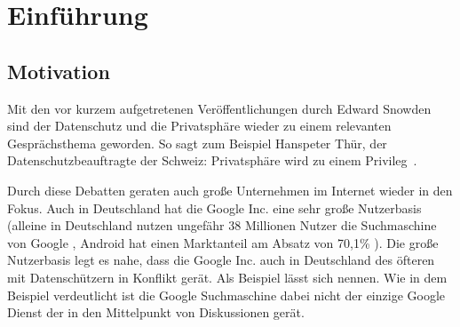 %
% 

\chapter{Einführung}


\section{Motivation}
Mit den vor kurzem aufgetretenen Veröffentlichungen durch Edward Snowden sind der Datenschutz und die Privatsphäre wieder zu einem relevanten Gesprächsthema geworden. So sagt zum Beispiel Hanspeter Thür, der Datenschutzbeauftragte der Schweiz: \glqq Privatsphäre wird zu einem Privileg\grqq\ \cite{nzzdatenschutzprivileg}.

Durch diese Debatten geraten auch große Unternehmen im Internet wieder in den Fokus. Auch in Deutschland hat die Google Inc. eine sehr große Nutzerbasis (alleine in Deutschland nutzen ungefähr 38 Millionen Nutzer die Suchmaschine von Google \cite{statistagoogle}, Android hat einen Marktanteil am Absatz von 70,1\% \cite{statistaandroid}). Die große Nutzerbasis legt es nahe, dass die Google Inc. auch in Deutschland des öfteren mit Datenschützern in Konflikt gerät. Als Beispiel lässt sich \citet{geodata} nennen. Wie in dem Beispiel verdeutlicht ist die Google Suchmaschine dabei nicht der einzige Google Dienst der in den Mittelpunkt von Diskussionen gerät.

